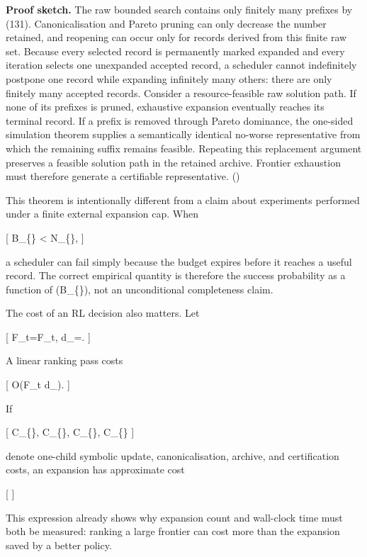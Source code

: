 \documentclass[
]{article}
\begin{document}
\textbf{Proof sketch.} The raw bounded search contains only finitely
many prefixes by (131). Canonicalisation and Pareto pruning can only
decrease the number retained, and reopening can occur only for records
derived from this finite raw set. Because every selected record is
permanently marked expanded and every iteration selects one unexpanded
accepted record, a scheduler cannot indefinitely postpone one record
while expanding infinitely many others: there are only finitely many
accepted records. Consider a resource-feasible raw solution path. If
none of its prefixes is pruned, exhaustive expansion eventually reaches
its terminal record. If a prefix is removed through Pareto dominance,
the one-sided simulation theorem supplies a semantically identical
no-worse representative from which the remaining suffix remains
feasible. Repeating this replacement argument preserves a feasible
solution path in the retained archive. Frontier exhaustion must
therefore generate a certifiable representative. (\square)

This theorem is intentionally different from a claim about experiments
performed under a finite external expansion cap. When

{[} B\_\{\} \textless{} N\_\{\}, {]}

a scheduler can fail simply because the budget expires before it reaches
a useful record. The correct empirical quantity is therefore the success
probability as a function of (B\_\{\}), not an unconditional
completeness claim.

The cost of an RL decision also matters. Let

{[} F\_t=\textbar{}\mathcal F\_t\textbar, \qquad
d\_\varphi=\dim\boldsymbol\varphi. {]}

A linear ranking pass costs

{[} O(F\_t d\_\varphi).  {]}

If

{[} C\_\{\}, \quad C\_\{\}, \quad
C\_\{\}, \quad C\_\{\} {]}

denote one-child symbolic update, canonicalisation, archive, and
certification costs, an expansion has approximate cost

{[}   {]}

This expression already shows why expansion count and wall-clock time
must both be measured: ranking a large frontier can cost more than the
expansion saved by a better policy.
\end{document}
